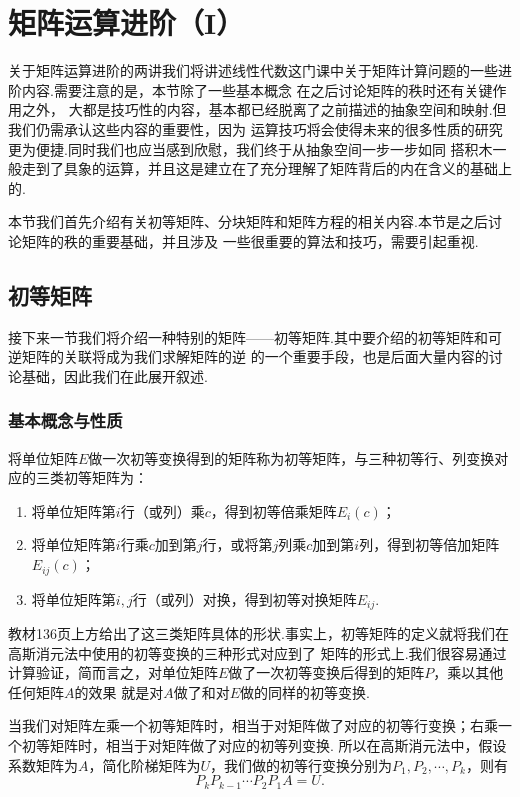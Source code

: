 \chapter{矩阵运算进阶（I）}

关于矩阵运算进阶的两讲我们将讲述线性代数这门课中关于矩阵计算问题的一些进阶内容.需要注意的是，本节除了一些基本概念
在之后讨论矩阵的秩时还有关键作用之外，
大都是技巧性的内容，基本都已经脱离了之前描述的抽象空间和映射.但我们仍需承认这些内容的重要性，因为
运算技巧将会使得未来的很多性质的研究更为便捷.同时我们也应当感到欣慰，我们终于从抽象空间一步一步如同
搭积木一般走到了具象的运算，并且这是建立在了充分理解了矩阵背后的内在含义的基础上的.

本节我们首先介绍有关初等矩阵、分块矩阵和矩阵方程的相关内容.本节是之后讨论矩阵的秩的重要基础，并且涉及
一些很重要的算法和技巧，需要引起重视.

\section{初等矩阵}
接下来一节我们将介绍一种特别的矩阵——初等矩阵.其中要介绍的初等矩阵和可逆矩阵的关联将成为我们求解矩阵的逆
的一个重要手段，也是后面大量内容的讨论基础，因此我们在此展开叙述.

\subsection{基本概念与性质}
\begin{definition}
    将单位矩阵$E$做一次初等变换得到的矩阵称为初等矩阵，与三种初等行、列变换对应的三类初等矩阵为：
    \begin{enumerate}
        \item 将单位矩阵第$i$行（或列）乘$c$，得到初等倍乘矩阵$E_i(c)$；

        \item 将单位矩阵第$i$行乘$c$加到第$j$行，或将第$j$列乘$c$加到第$i$列，得到初等倍加矩阵$E_{ij}(c)$；

        \item 将单位矩阵第$i,j$行（或列）对换，得到初等对换矩阵$E_{ij}$.
    \end{enumerate}
\end{definition}
教材136页上方给出了这三类矩阵具体的形状.事实上，初等矩阵的定义就将我们在高斯消元法中使用的初等变换的三种形式对应到了
矩阵的形式上.我们很容易通过计算验证，简而言之，对单位矩阵$E$做了一次初等变换后得到的矩阵$P$，乘以其他任何矩阵$A$的效果
就是对$A$做了和对$E$做的同样的初等变换.

当我们对矩阵左乘一个初等矩阵时，相当于对矩阵做了对应的初等行变换；右乘一个初等矩阵时，相当于对矩阵做了对应的初等列变换.
所以在高斯消元法中，假设系数矩阵为$A$，简化阶梯矩阵为$U$，我们做的初等行变换分别为$P_1,P_2,\cdots,P_k$，则有
\[P_kP_{k-1}\cdots P_2P_1A=U.\]


